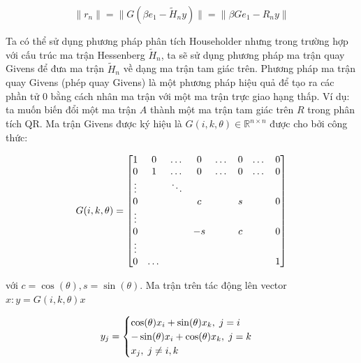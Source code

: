\documentclass[14pt, a4paper]{article}
\numberwithin{equation}{section}
\numberwithin{algorithm}{section}
\numberwithin{figure}{section}
\numberwithin{dl}{section}
\numberwithin{md}{section}
\numberwithin{bd}{section}
\numberwithin{dn}{section}
\numberwithin{hq}{section}
\begin{document}
\begin{equation} \label{eq:Givens-Apply}
    \lVert r_n \rVert = \lVert G(\beta e_1 - \widetilde{H}_n y) \rVert = \lVert \beta G e_1 - R_n y \rVert
\end{equation}


Ta có thể sử dụng phương pháp phân tích Householder nhưng trong trường hợp với cấu trúc ma trận Hessenberg $\widetilde{H}_n$, ta sẽ sử dụng phương pháp ma trận quay Givens để đưa ma trận $\widetilde{H}_n$ về dạng ma trận tam giác trên.
Phương pháp ma trận quay Givens (phép quay Givens) là một phương pháp hiệu quả để tạo ra các phần tử 0 bằng cách nhân ma trận với một ma trận trực giao hạng thấp. Ví dụ: ta muốn biến đổi một ma trận $A$ thành một ma trận tam giác trên $R$ trong phân tích QR.
Ma trận Givens được ký hiệu là $G(i, k, \theta) \in \mathbb{R}^{n \times n}$ được cho bởi công thức:

\begin{equation} \label{eq:Givens-Rotation-Matrix}
    G(i, k, \theta) = \begin{bmatrix} 1 & 0 & \dots & 0 & \dots & 0 & \dots & 0 \\
                                    0 & 1 & \dots & 0 & \dots & 0 & \dots & 0 \\
                                    \vdots & \thickspace & \ddots & \thickspace & \thickspace & \thickspace & \thickspace \\
                                    0 & \thickspace & \space & c & \thickspace & s & \thickspace & 0 \\
                                    \vdots \\
                                    0 & \thickspace & \space & -s & \thickspace & c & \thickspace & 0 \\
                                    \vdots \\
                                    0 & \dots & \thickspace & \thickspace & \thickspace & \thickspace & \space & 1    \end{bmatrix}
\end{equation}

với $c = \cos(\theta), s = \sin(\theta)$. Ma trận trên tác động lên vector $x: y=G(i, k, \theta)x$

\begin{equation} \label{eq:Rotation-Result}
    y_j = \begin{cases}
        \cos(\theta) x_i + \sin(\theta) x_k, \thickspace j = i \\
        -\sin(\theta) x_i + \cos(\theta) x_k, \thickspace j = k \\
        x_j, \thickspace j \neq i, k
    \end{cases}
\end{equation}
\end{document}
